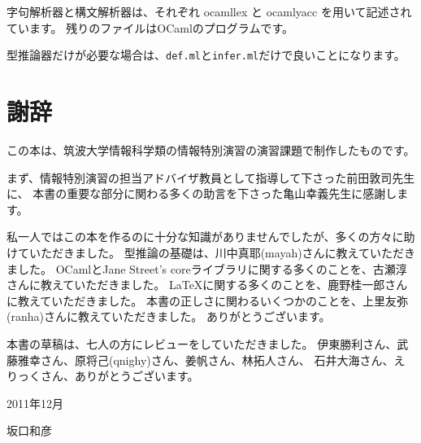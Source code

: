 字句解析器と構文解析器は、それぞれ ocamllex と ocamlyacc を用いて記述されています。
残りのファイルはOCamlのプログラムです。

型推論器だけが必要な場合は、\texttt{def.ml}と\texttt{infer.ml}だけで良いことになります。

\section*{謝辞}

この本は、筑波大学情報科学類の情報特別演習の演習課題で制作したものです。

まず、情報特別演習の担当アドバイザ教員として指導して下さった前田敦司先生に、
本書の重要な部分に関わる多くの助言を下さった亀山幸義先生に感謝します。

私一人ではこの本を作るのに十分な知識がありませんでしたが、多くの方々に助けていただきました。
型推論の基礎は、川中真耶(mayah)さんに教えていただきました。
OCamlとJane Street's coreライブラリに関する多くのことを、古瀬淳さんに教えていただきました。
\LaTeX{}に関する多くのことを、鹿野桂一郎さんに教えていただきました。
本書の正しさに関わるいくつかのことを、上里友弥(ranha)さんに教えていただきました。
ありがとうございます。

本書の草稿は、七人の方にレビューをしていただきました。
伊東勝利さん、武藤雅幸さん、原将己(qnighy)さん、姜帆さん、林拓人さん、
石井大海さん、えりっくさん、ありがとうございます。

\begin{flushright}
2011年12月

坂口和彦
\end{flushright}

